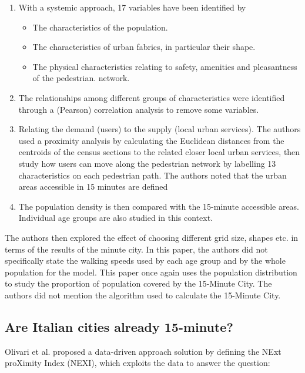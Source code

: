 \begin{enumerate}
\item With a systemic approach, 17 variables have been identified by
\begin{itemize}
    \item The characteristics of the population.
    \item The characteristics of urban fabrics, in particular their shape.
    \item The physical characteristics relating to safety, amenities and pleasantness of the pedestrian.
    network.
\end{itemize}
\item The relationships among different groups of characteristics were identified through a (Pearson) correlation analysis to remove some variables.
\item Relating the demand (users) to the supply (local urban services). The authors used a proximity analysis by calculating the Euclidean distances from the centroids of the census sections to the related closer local urban services, then study how users can move along the pedestrian network by labelling 13 characteristics on each pedestrian path. The authors noted that the urban areas accessible in 15 minutes are defined 
\item The population density is then compared with the 15-minute accessible areas. Individual age groups are also studied in this context.
\end{enumerate}

The authors then explored the effect of choosing different grid size, shapes etc. in terms of the results of the minute city. In this paper, the authors did not specifically state the walking speeds used by each age group and by the whole population for the model. This paper once again uses the population distribution to study the proportion of population covered by the 15-Minute City. The authors did not mention the algorithm used to calculate the 15-Minute City.

\subsection{Are Italian cities already 15-minute?} \label{olivari_are_2023}

Olivari et al. proposed a data-driven approach solution by defining the NExt proXimity Index (NEXI), which exploits the data to answer the question:  \cite{olivari_are_2023}

